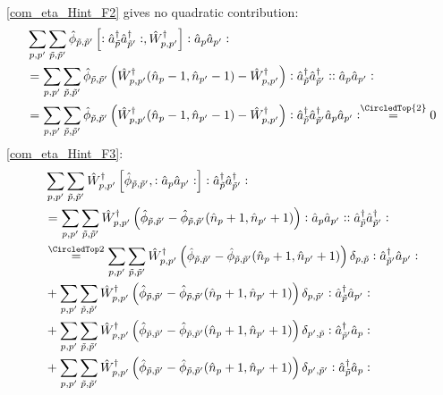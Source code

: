 \begin{appendix}
\begin{itemize}
\begin{align}
\end{align}
\ref{com_eta_Hint_F2} gives no quadratic contribution:
\begin{align}
&\Sum_{p, p^\prime}\Sum_{\tilde p,\tilde p^\prime}\hat\phi_{\tilde p,\tilde p^\prime} \left[\NO\CR_{\tilde p}\CR_{\tilde p^\prime}\NO,\hat W_{p,p^\prime}^\dagger\right]\NO\AN_p\AN_{p^\prime}\NO\nonumber\\
&=\Sum_{p, p^\prime}\Sum_{\tilde p,\tilde p^\prime}\hat\phi_{\tilde p,\tilde p^\prime} \left(\hat W_{p,p^\prime}^\dagger(\hat n_p-1,\hat n_{p^\prime}-1)-\hat W_{p,p^\prime}^\dagger\right)\NO\CR_{\tilde p}\CR_{\tilde p^\prime}\NO\NO\AN_p\AN_{p^\prime}\NO\nonumber\\
&=\Sum_{p, p^\prime}\Sum_{\tilde p,\tilde p^\prime}\hat\phi_{\tilde p,\tilde p^\prime} \left(\hat W_{p,p^\prime}^\dagger(\hat n_p-1,\hat n_{p^\prime}-1)-\hat W_{p,p^\prime}^\dagger\right)\NO\CR_{\tilde p}\CR_{\tilde p^\prime}\AN_p\AN_{p^\prime}\NO\overset{\CircledTop{2}}=0
\end{align}
\ref{com_eta_Hint_F3}:
\begin{align}
&\Sum_{p, p^\prime}\Sum_{\tilde p,\tilde p^\prime}\hat W_{p,p^\prime}^\dagger \left[\hat\phi_{\tilde p,\tilde p^\prime},\NO\AN_p\AN_{p^\prime}\NO\right]\NO\CR_{\tilde p}\CR_{\tilde p^\prime}\NO\nonumber\\
&=\Sum_{p, p^\prime}\Sum_{\tilde p,\tilde p^\prime}\hat W_{p,p^\prime}^\dagger \left(\hat\phi_{\tilde p,\tilde p^\prime}-\hat\phi_{\tilde p,\tilde p^\prime}(\hat n_p+1,\hat n_{p^\prime}+1)\right)\NO\AN_p\AN_{p^\prime}\NO\NO\CR_{\tilde p}\CR_{\tilde p^\prime}\NO\\
&\eqsec \Sum_{p, p^\prime}\Sum_{\tilde p,\tilde p^\prime}\hat W_{p,p^\prime}^\dagger \left(\hat\phi_{\tilde p,\tilde p^\prime}-\hat\phi_{\tilde p,\tilde p^\prime}(\hat n_p+1,\hat n_{p^\prime}+1)\right)\delta_{p,\tilde p}\NO\CR_{\tilde p^\prime}\AN_{p^\prime}\NO \\
&+\Sum_{p, p^\prime}\Sum_{\tilde p,\tilde p^\prime}\hat W_{p,p^\prime}^\dagger \left(\hat\phi_{\tilde p,\tilde p^\prime}-\hat\phi_{\tilde p,\tilde p^\prime}(\hat n_p+1,\hat n_{p^\prime}+1)\right)\delta_{p,\tilde p^\prime}\NO\CR_{\tilde p}\AN_{p^\prime}\NO \nonumber\\
&+\Sum_{p, p^\prime}\Sum_{\tilde p,\tilde p^\prime}\hat W_{p,p^\prime}^\dagger \left(\hat\phi_{\tilde p,\tilde p^\prime}-\hat\phi_{\tilde p,\tilde p^\prime}(\hat n_p+1,\hat n_{p^\prime}+1)\right)\delta_{p^\prime,\tilde p}\NO\CR_{\tilde p^\prime}\AN_{p}\NO \nonumber\\
&+\Sum_{p, p^\prime}\Sum_{\tilde p,\tilde p^\prime}\hat W_{p,p^\prime}^\dagger \left(\hat\phi_{\tilde p,\tilde p^\prime}-\hat\phi_{\tilde p,\tilde p^\prime}(\hat n_p+1,\hat n_{p^\prime}+1)\right)\delta_{p^\prime,\tilde p^\prime}\NO\CR_{\tilde p}\AN_{p}\NO \nonumber\\

\end{align}
\end{itemize}
\end{appendix}
